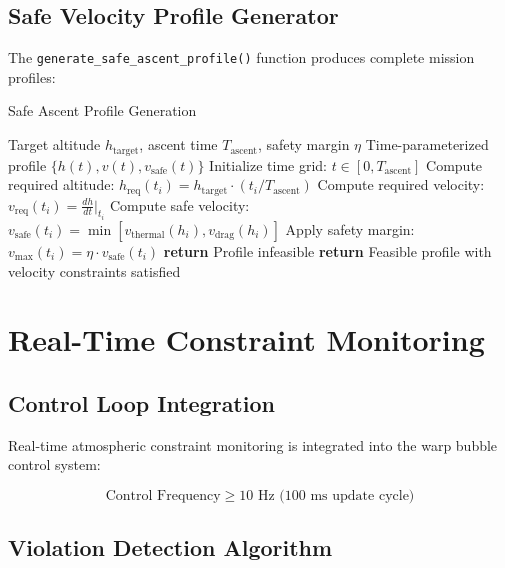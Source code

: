 \documentclass[12pt,a4paper]{article}
\begin{document}
\subsection{Safe Velocity Profile Generator}

The \texttt{generate\_safe\_ascent\_profile()} function produces complete mission profiles:

\begin{algorithm}
\caption{Safe Ascent Profile Generation}
\begin{algorithmic}
\Require Target altitude $h_{\text{target}}$, ascent time $T_{\text{ascent}}$, safety margin $\eta$
\Ensure Time-parameterized profile $\{h(t), v(t), v_{\text{safe}}(t)\}$
\State Initialize time grid: $t \in [0, T_{\text{ascent}}]$
    \State Compute required altitude: $h_{\text{req}}(t_i) = h_{\text{target}} \cdot (t_i / T_{\text{ascent}})$
    \State Compute required velocity: $v_{\text{req}}(t_i) = \frac{dh}{dt}\big|_{t_i}$
    \State Compute safe velocity: $v_{\text{safe}}(t_i) = \min[v_{\text{thermal}}(h_i), v_{\text{drag}}(h_i)]$
    \State Apply safety margin: $v_{\text{max}}(t_i) = \eta \cdot v_{\text{safe}}(t_i)$
        \State \textbf{return} Profile infeasible
    \EndIf
\EndFor
\State \textbf{return} Feasible profile with velocity constraints satisfied
\end{algorithmic}
\end{algorithm}

\section{Real-Time Constraint Monitoring}

\subsection{Control Loop Integration}

Real-time atmospheric constraint monitoring is integrated into the warp bubble control system:

\begin{equation}
\text{Control Frequency} \geq 10 \text{ Hz (100 ms update cycle)}
\end{equation}

\subsection{Violation Detection Algorithm}
\end{document}
